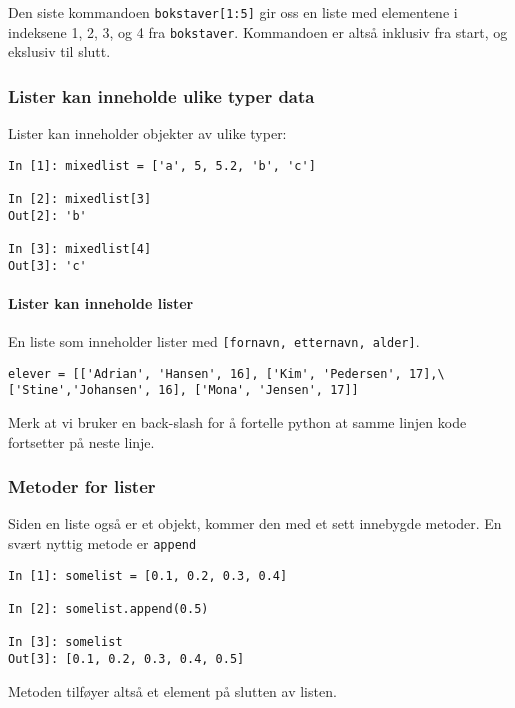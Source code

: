 \documentclass[]{article}
\let\oldparagraph\paragraph
\renewcommand{\paragraph}[1]{\oldparagraph{#1}\mbox{}}
\begin{document}
Den siste kommandoen \texttt{bokstaver{[}1:5{]}} gir oss en liste med
elementene i indeksene 1, 2, 3, og 4 fra \texttt{bokstaver}. Kommandoen
er altså inklusiv fra start, og ekslusiv til slutt.

\subsubsection{Lister kan inneholde ulike typer
data}\label{lister-kan-inneholde-ulike-typer-data}

Lister kan inneholder objekter av ulike typer:

\begin{verbatim}
In [1]: mixedlist = ['a', 5, 5.2, 'b', 'c']

In [2]: mixedlist[3]
Out[2]: 'b'

In [3]: mixedlist[4]
Out[3]: 'c'
\end{verbatim}

\paragraph{Lister kan inneholde
lister}\label{lister-kan-inneholde-lister}

En liste som inneholder lister med
\texttt{{[}fornavn,\ etternavn,\ alder{]}}.

\begin{verbatim}
elever = [['Adrian', 'Hansen', 16], ['Kim', 'Pedersen', 17],\
['Stine','Johansen', 16], ['Mona', 'Jensen', 17]]
\end{verbatim}

Merk at vi bruker en back-slash for å fortelle python at samme linjen
kode fortsetter på neste linje.

\subsubsection{Metoder for lister}\label{metoder-for-lister}

Siden en liste også er et objekt, kommer den med et sett innebygde
metoder. En svært nyttig metode er \texttt{append}

\begin{verbatim}
In [1]: somelist = [0.1, 0.2, 0.3, 0.4]

In [2]: somelist.append(0.5)

In [3]: somelist
Out[3]: [0.1, 0.2, 0.3, 0.4, 0.5]
\end{verbatim}

Metoden tilføyer altså et element på slutten av listen.
\end{document}
